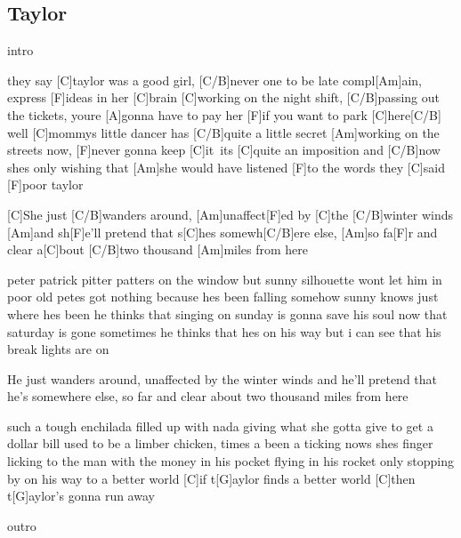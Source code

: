 \subsection*{Taylor   }
\begin{guitar}
intro
 


they say [C]taylor was a good girl, [C/B]never one to be late
compl[Am]ain, express [F]ideas in her [C]brain
[C]working on the night shift, [C/B]passing out the tickets,
youre [A]gonna have to pay her [F]if you want to park [C]here[C/B]\qquad[Am]\qquad[F]\,
well [C]mommys little dancer has [C/B]quite a little secret
[Am]working on the streets now, [F]never gonna keep [C]it\qquad[C/B]\qquad[Am]\qquad[F]\,
its [C]quite an imposition and [C/B]now shes only wishing
that [Am]she would have listened [F]to the words they [C]said\qquad[C/B]\qquad[Am]\,
[F]poor taylor 


[C]She just [C/B]wanders around, [Am]unaffect[F]ed by
[C]the [C/B]winter winds [Am]and sh[F]e'll pretend that
s[C]hes somewh[C/B]ere else, [Am]so fa[F]r and clear
a[C]bout [C/B]two thousand [Am]miles from here


peter patrick pitter patters on the window
but sunny silhouette wont let him in
poor old petes got nothing because hes been falling
somehow sunny knows just where hes been
he thinks that singing on sunday is gonna save his soul
now that saturday is gone
sometimes he thinks that hes on his way
but i can see 
that his break lights are on


He just wanders around, unaffected by
the winter winds and he'll pretend that
he's somewhere else, so far and clear
about two thousand miles from here


such a tough enchilada filled up with nada
giving what she gotta give to get a dollar bill
used to be a limber chicken, times a been a ticking
nows shes finger licking to the man
with the money in his pocket flying in his rocket
only stopping by on his way to a better world
[C]\qquad[D]\qquad[F]if t[G]aylor finds a better world
[C]\qquad[D]\qquad[F]then t[G]aylor's gonna run away



outro
\end{guitar}
